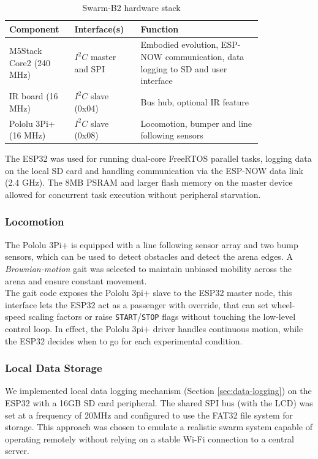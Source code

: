 \documentclass[conference]{IEEEtran}
\begin{document}
\begin{table}[h]
  \centering
  \caption{Swarm-B2 hardware stack}
  \label{tab:B2-hardware}
  \begin{tabular}{p{0.18\linewidth} p{0.22\linewidth} p{0.42\linewidth}}
    \toprule
    Component & Interface(s) & Function \\
    \midrule
    M5Stack Core2 (240 MHz) & $I^2C$ master and SPI & Embodied evolution, ESP-NOW communication, data logging to SD and user interface \\
    IR board (16 MHz) & $I^2C$ slave (0x04) & Bus hub, optional IR feature \\
    Pololu 3Pi+ (16 MHz) & $I^2C$ slave (0x08) & Locomotion, bumper and line following sensors \\

    \bottomrule
  \end{tabular}
\end{table}

The ESP32 was used for running dual-core FreeRTOS parallel tasks, logging data on the local SD card and handling communication via the ESP-NOW data link (2.4 GHz). The 8MB PSRAM and larger flash memory on the master device allowed for concurrent task execution without peripheral starvation.\\

\subsubsection{Locomotion}\label{sec:locomotion}

The Pololu 3Pi+ is equipped with a line following sensor array and two bump sensors, which can be used to detect obstacles and detect the arena edges. A \emph{Brownian-motion} gait was selected to maintain unbiased mobility across the arena and ensure constant movement.\\

The gait code exposes the Pololu 3pi+ slave to the ESP32 master node, this interface lets the ESP32 act as a passenger with override, that can set wheel-speed scaling factors or raise \texttt{START}/\texttt{STOP} flags without touching the low-level control loop. In effect, the Pololu 3pi+ driver handles continuous motion, while the ESP32 decides when to go for each experimental condition.\\

\subsubsection{Local Data Storage}
We implemented local data logging mechanism (Section \ref{sec:data-logging}) on the ESP32 with a 16GB SD card peripheral. The shared SPI bus (with the LCD) was set at a frequency of 20MHz and configured to use the FAT32 file system for storage. This approach was chosen to emulate a realistic swarm system capable of operating remotely without relying on a stable Wi-Fi connection to a central server.\\
\end{document}
